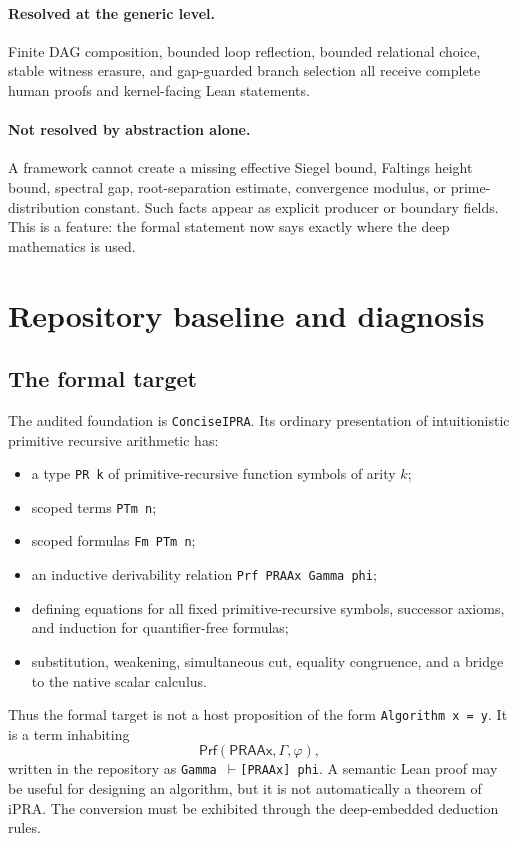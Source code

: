 \documentclass[11pt]{article}
\newcommand{\PRAAx}{\mathsf{PRAAx}}
\newcommand{\Prf}{\mathsf{Prf}}
\begin{document}
\paragraph{Resolved at the generic level.}
Finite DAG composition, bounded loop reflection, bounded relational choice,
stable witness erasure, and gap-guarded branch selection all receive complete
human proofs and kernel-facing Lean statements.

\paragraph{Not resolved by abstraction alone.}
A framework cannot create a missing effective Siegel bound, Faltings height
bound, spectral gap, root-separation estimate, convergence modulus, or
prime-distribution constant.  Such facts appear as explicit producer or
boundary fields.  This is a feature: the formal statement now says exactly
where the deep mathematics is used.

\section{Repository baseline and diagnosis}
\label{sec:audit}

\subsection{The formal target}

The audited foundation is \texttt{ConciseIPRA}.  Its ordinary presentation of
intuitionistic primitive recursive arithmetic has:

\begin{itemize}
\item a type \texttt{PR k} of primitive-recursive function symbols of arity
      \(k\);
\item scoped terms \texttt{PTm n};
\item scoped formulas \texttt{Fm PTm n};
\item an inductive derivability relation \texttt{Prf PRAAx Gamma phi};
\item defining equations for all fixed primitive-recursive symbols,
      successor axioms, and induction for quantifier-free formulas;
\item substitution, weakening, simultaneous cut, equality congruence, and a
      bridge to the native scalar calculus.
\end{itemize}

Thus the formal target is not a host proposition of the form
\texttt{Algorithm x = y}.  It is a term inhabiting
\[
  \Prf(\PRAAx,\Gamma,\varphi),
\]
written in the repository as
\texttt{Gamma \(\vdash\)[PRAAx] phi}.  A semantic Lean proof may be useful
for designing an algorithm, but it is not automatically a theorem of iPRA.
The conversion must be exhibited through the deep-embedded deduction rules.
\end{document}
